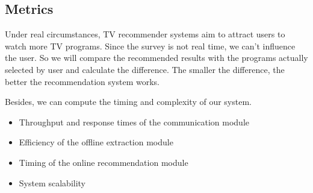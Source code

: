 \subsection{Metrics}
Under real circumstances, TV recommender systems aim to attract users to watch
more TV programs. Since the survey is not real time, we can't influence the user.
So we will compare the recommended results with the programs actually selected by user
and calculate the difference. The smaller the difference, the better the recommendation
system works.

Besides, we can compute the timing and complexity of our system.
\begin{itemize}
\item Throughput and response times of the communication module
\item Efficiency of the offline extraction module
\item Timing of the online recommendation module
\item System scalability
\end{itemize}
%
%
%
%



